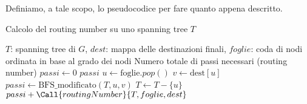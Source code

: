 Definiamo, a tale scopo, lo pseudocodice per fare quanto appena descritto.

\begin{algorithm}
\caption{Calcolo del routing number su uno spanning tree $T$}\label{alg:cap}
\begin{algorithmic}[1]
\Require $T$: spanning tree di $G$, $dest$: mappa delle destinazioni finali, $foglie$: coda di nodi ordinata in base al grado dei nodi
\Ensure Numero totale di passi necessari (routing number)
    \State $passi \gets 0$
        \State \Return $passi$
    \Else
        \State $u \gets \text{foglie}.pop()$
        \State $v \gets \text{dest}[u]$
        \State $passi \gets \text{BFS\_modificato}(T, u, v)$
        \State $T \gets T - \{u\}$
        \State \Return $passi + \Call{routingNumber}{T, foglie, dest}$
    \EndIf
\EndFunction
\end{algorithmic}
\label{routing number spanning tree}
\end{algorithm}
\newpage
